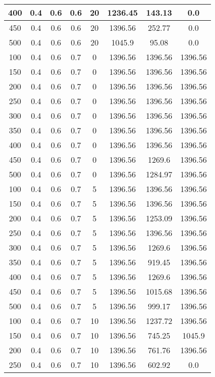 \documentclass[a4paper, 12pt]{extreport}
\begin{document}
\begin{itemize}
\begin{longtable}{|c|c|c|c|c|c|c|c|}
			400 & 0.4 & 0.6 & 0.6 & 20 & 1236.45 & 143.13 & 0.0 \\\hline
			450 & 0.4 & 0.6 & 0.6 & 20 & 1396.56 & 252.77 & 0.0 \\\hline
			500 & 0.4 & 0.6 & 0.6 & 20 & 1045.9 & 95.08 & 0.0 \\\hline
			100 & 0.4 & 0.6 & 0.7 & 0 & 1396.56 & 1396.56 & 1396.56 \\\hline
			150 & 0.4 & 0.6 & 0.7 & 0 & 1396.56 & 1396.56 & 1396.56 \\\hline
			200 & 0.4 & 0.6 & 0.7 & 0 & 1396.56 & 1396.56 & 1396.56 \\\hline
			250 & 0.4 & 0.6 & 0.7 & 0 & 1396.56 & 1396.56 & 1396.56 \\\hline
			300 & 0.4 & 0.6 & 0.7 & 0 & 1396.56 & 1396.56 & 1396.56 \\\hline
			350 & 0.4 & 0.6 & 0.7 & 0 & 1396.56 & 1396.56 & 1396.56 \\\hline
			400 & 0.4 & 0.6 & 0.7 & 0 & 1396.56 & 1396.56 & 1396.56 \\\hline
			450 & 0.4 & 0.6 & 0.7 & 0 & 1396.56 & 1269.6 & 1396.56 \\\hline
			500 & 0.4 & 0.6 & 0.7 & 0 & 1396.56 & 1284.97 & 1396.56 \\\hline
			100 & 0.4 & 0.6 & 0.7 & 5 & 1396.56 & 1396.56 & 1396.56 \\\hline
			150 & 0.4 & 0.6 & 0.7 & 5 & 1396.56 & 1396.56 & 1396.56 \\\hline
			200 & 0.4 & 0.6 & 0.7 & 5 & 1396.56 & 1253.09 & 1396.56 \\\hline
			250 & 0.4 & 0.6 & 0.7 & 5 & 1396.56 & 1396.56 & 1396.56 \\\hline
			300 & 0.4 & 0.6 & 0.7 & 5 & 1396.56 & 1269.6 & 1396.56 \\\hline
			350 & 0.4 & 0.6 & 0.7 & 5 & 1396.56 & 919.45 & 1396.56 \\\hline
			400 & 0.4 & 0.6 & 0.7 & 5 & 1396.56 & 1269.6 & 1396.56 \\\hline
			450 & 0.4 & 0.6 & 0.7 & 5 & 1396.56 & 1015.68 & 1396.56 \\\hline
			500 & 0.4 & 0.6 & 0.7 & 5 & 1396.56 & 999.17 & 1396.56 \\\hline
			100 & 0.4 & 0.6 & 0.7 & 10 & 1396.56 & 1237.72 & 1396.56 \\\hline
			150 & 0.4 & 0.6 & 0.7 & 10 & 1396.56 & 745.25 & 1045.9 \\\hline
			200 & 0.4 & 0.6 & 0.7 & 10 & 1396.56 & 761.76 & 1396.56 \\\hline
			250 & 0.4 & 0.6 & 0.7 & 10 & 1396.56 & 602.92 & 0.0 \\\hline

\end{longtable}
\end{itemize}
\end{document}
